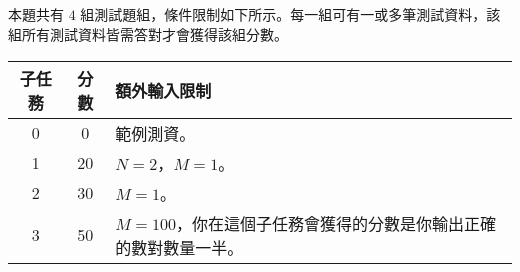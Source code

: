 \subsection*{}
{
\setlength\parindent{0pt}
}
\subsection*{}
{
\setlength\parindent{0pt}
}
\subsection*{}
本題共有 $4$ 組測試題組，條件限制如下所示。每一組可有一或多筆測試資料，該組所有測試資料皆需答對才會獲得該組分數。
\begin{center}
    \begin{tabular}[t]{@{}ccl@{}}
    \toprule
    子任務 & 分數 & 額外輸入限制\\
    \midrule
    0 & 0  & 範例測資。\\
    1 & 20 & $N=2$，$M=1$。\\
    2 & 30 & $M=1$。\\
    3 & 50 & $M=100$，你在這個子任務會獲得的分數是你輸出正確的數對數量一半。\\
    \bottomrule
    \end{tabular}
\end{center}


